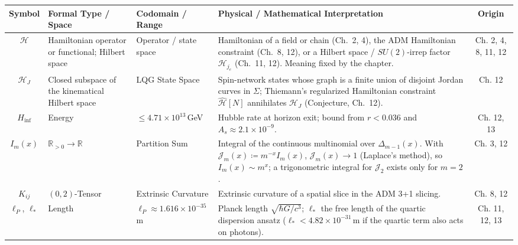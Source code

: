 \documentclass[11pt,a4paper,oneside]{article}
\begin{document}
\begin{table}[!htbp]
\centering
\scriptsize
\renewcommand{\arraystretch}{1.2}
\begin{tabularx}{\textwidth}{@{} c p{3.0cm} p{2.6cm} X c @{}}
\toprule
\textbf{Symbol} & \textbf{Formal Type / Space} & \textbf{Codomain / Range} & \textbf{Physical / Mathematical Interpretation} & \textbf{Origin} \\
\midrule
$\mathcal{H}$ & Hamiltonian operator or functional; Hilbert space & Operator / state space & Hamiltonian of a field or chain (Ch.~2, 4), the ADM Hamiltonian constraint (Ch.~8, 12), or a Hilbert space / $SU(2)$-irrep factor $\mathcal{H}_{j_e}$ (Ch.~11, 12). Meaning fixed by the chapter. & Ch. 2, 4, 8, 11, 12 \\
$\mathscr{H}_J$ & Closed subspace of the kinematical Hilbert space & LQG State Space & Spin-network states whose graph is a finite union of disjoint Jordan curves in $\Sigma$; Thiemann's regularized Hamiltonian constraint $\widehat{\mathcal{H}}[N]$ annihilates $\mathscr{H}_J$ (Conjecture, Ch.~12). & Ch. 12 \\
$H_{\mathrm{inf}}$ & Energy & $\le 4.71 \times 10^{13}$\,GeV & Hubble rate at horizon exit; bound from $r < 0.036$ and $A_s \approx 2.1 \times 10^{-9}$. & Ch. 12, 13 \\
$I_m(x)$ & $\mathbb{R}_{>0} \to \mathbb{R}$ & Partition Sum & Integral of the continuous multinomial over $\Delta_{m-1}(x)$. With $\mathcal{J}_m(x) \coloneqq m^{-x}I_m(x)$, $\mathcal{J}_m(x) \to 1$ (Laplace's method), so $I_m(x) \sim m^x$; a trigonometric integral for $\mathcal{J}_2$ exists only for $m = 2$. & Ch. 3, 12 \\
$K_{ij}$ & $(0,2)$-Tensor & Extrinsic Curvature & Extrinsic curvature of a spatial slice in the ADM 3+1 slicing. & Ch. 8, 12 \\
$\ell_P$, $\ell_\ast$ & Length & $\ell_P \approx 1.616 \times 10^{-35}$\,m & Planck length $\sqrt{\hbar G/c^3}$; $\ell_\ast$ the free length of the quartic dispersion ansatz ($\ell_\ast < 4.82 \times 10^{-31}$\,m if the quartic term also acts on photons). & Ch. 11, 12, 13 \\
\bottomrule
\end{tabularx}
\end{table}
\end{document}
